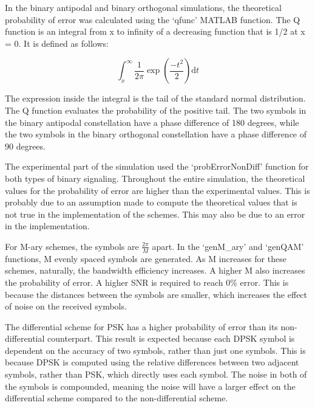 \documentclass[12pt]{report}
\newcommand{\dd}[1]{\mathrm{d}#1}                   %
\begin{document}
\quad In the binary antipodal and binary orthogonal simulations, the theoretical probability of error was calculated using the `qfunc' MATLAB function. The Q function is an integral from x to infinity of a decreasing function that is 1/2 at x = 0. It is defined as follows:

\begin{equation}
    \int_{x}^{\infty} \frac {1}{2\pi} \exp(\frac {-t^2}{2}) \dd{t}
\end{equation}

\noindent The expression inside the integral is the tail of the standard normal distribution. The Q function evaluates the probability of the positive tail. The two symbols in the binary antipodal constellation have a phase difference of 180 degrees, while the two symbols in the binary orthogonal constellation have a phase difference of 90 degrees.

 
\quad The experimental part of the simulation used the `probErrorNonDiff' function for both types of binary signaling. Throughout the entire simulation, the theoretical values for the probability of error are higher than the experimental values. This is probably due to an assumption made to compute the theoretical values that is not true in the implementation of the schemes. This may also be due to an error in the implementation.

\quad For M-ary schemes, the symbols are $\frac {2\pi}{M}$ apart. In the `genM\_ary' and `genQAM' functions, M evenly spaced symbols are generated. As M increases for these schemes, naturally, the bandwidth efficiency increases. A higher M also increases the probability of error. A higher SNR is required to reach 0\% error. This is because the distances between the symbols are smaller, which increases the effect of noise on the received symbols.

\quad The differential scheme for PSK has a higher probability of error than its non-differential counterpart. This result is expected because each DPSK symbol is dependent on the accuracy of two symbols, rather than just one symbols. This is because DPSK is computed using the relative differences between two adjacent symbols, rather than PSK, which directly uses each symbol. The noise in both of the symbols is compounded, meaning the noise will have a larger effect on the differential scheme compared to the non-differential scheme.
\end{document}
